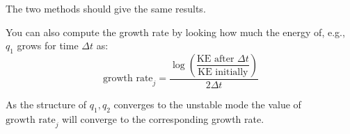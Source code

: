 \documentclass[10pt]{article}
\begin{document}
The two methods should give the same results.

You can also compute the growth rate by looking how much the energy of, e.g., $q_1$ grows for time $\Delta t$ as:
\begin{equation}
\textrm{growth rate}_j = \dfrac{\log{\left(\dfrac{\textrm{KE after $\Delta t$}}{\textrm{KE initially}}\right)}}{2\Delta t}
\end{equation}

As the structure of $q_1,q_2$ converges to the unstable mode the value of $\textrm{growth rate}_j$ will converge to the corresponding growth rate.






\end{document}
